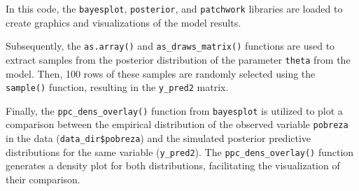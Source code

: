 \documentclass[
  12pt,
]{book}
\newenvironment{Shaded}{\begin{snugshade}}{\end{snugshade}}
\newcommand{\AttributeTok}[1]{\textcolor[rgb]{0.13,0.29,0.53}{#1}}
\newcommand{\CommentTok}[1]{\textcolor[rgb]{0.56,0.35,0.01}{\textit{#1}}}
\newcommand{\DecValTok}[1]{\textcolor[rgb]{0.00,0.00,0.81}{#1}}
\newcommand{\FunctionTok}[1]{\textcolor[rgb]{0.13,0.29,0.53}{\textbf{#1}}}
\newcommand{\NormalTok}[1]{#1}
\newcommand{\OtherTok}[1]{\textcolor[rgb]{0.56,0.35,0.01}{#1}}
\newcommand{\SpecialCharTok}[1]{\textcolor[rgb]{0.81,0.36,0.00}{\textbf{#1}}}
\newcommand{\StringTok}[1]{\textcolor[rgb]{0.31,0.60,0.02}{#1}}
\begin{document}
In this code, the \texttt{bayesplot}, \texttt{posterior}, and \texttt{patchwork} libraries are loaded to create graphics and visualizations of the model results.

Subsequently, the \texttt{as.array()} and \texttt{as\_draws\_matrix()} functions are used to extract samples from the posterior distribution of the parameter \texttt{theta} from the model. Then, 100 rows of these samples are randomly selected using the \texttt{sample()} function, resulting in the \texttt{y\_pred2} matrix.

Finally, the \texttt{ppc\_dens\_overlay()} function from \texttt{bayesplot} is utilized to plot a comparison between the empirical distribution of the observed variable \texttt{pobreza} in the data (\texttt{data\_dir\$pobreza}) and the simulated posterior predictive distributions for the same variable (\texttt{y\_pred2}). The \texttt{ppc\_dens\_overlay()} function generates a density plot for both distributions, facilitating the visualization of their comparison.

\begin{Shaded}
\end{Shaded}
\end{document}

